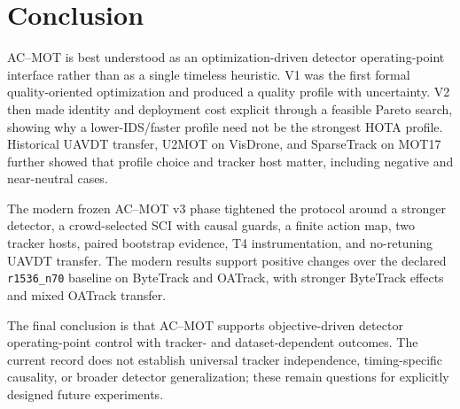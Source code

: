 \section{Conclusion}
AC--MOT is best understood as an optimization-driven detector operating-point
interface rather than as a single timeless heuristic. V1 was the first formal
quality-oriented optimization and produced a quality profile with uncertainty.
V2 then made identity and deployment cost explicit through a feasible Pareto
search, showing why a lower-IDS/faster profile need not be the strongest HOTA
profile.
Historical UAVDT transfer, U2MOT on VisDrone, and SparseTrack on MOT17 further
showed that profile choice and tracker host matter, including negative and
near-neutral cases.

The modern frozen AC--MOT v3 phase tightened the protocol around a stronger
detector, a crowd-selected SCI with causal guards, a finite action map, two
tracker hosts, paired bootstrap evidence, T4 instrumentation, and no-retuning
UAVDT transfer. The modern results support positive changes over the declared
\texttt{r1536\_n70} baseline on ByteTrack and OATrack, with stronger ByteTrack
effects and mixed OATrack transfer.

The final conclusion is that AC--MOT supports objective-driven detector
operating-point control with tracker- and dataset-dependent outcomes. The
current record does not establish universal tracker independence,
timing-specific causality, or broader detector generalization; these remain
questions for explicitly designed future experiments.
